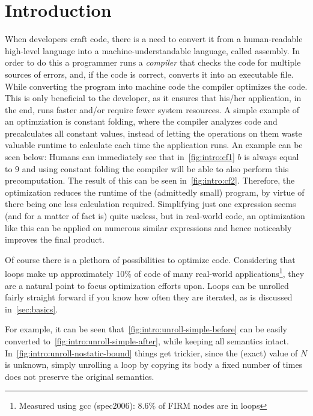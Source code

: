 \chapter{Introduction}\label{sec:intro}



When developers craft code, there is a need to convert it from a human-readable high-level language into a machine-understandable language, called assembly.
In order to do this a programmer runs a \textit{compiler} that checks the code for multiple sources of errors, and, if the code is correct, converts it into an executable file.
While converting the program into machine code the compiler optimizes the code.
This is only beneficial to the developer, as it ensures that his/her application, in the end, runs faster and/or require fewer system resources.
A simple example of an optimziation is constant folding, where the compiler analyzes code and precalculates all constant values, instead of letting the operations on them waste valuable runtime to calculate each time the application runs.
An example can be seen below:
Humans can immediately see that in~\cref{fig:intro:cf1} $b$ is always equal to $9$ and using constant folding the compiler will be able to also perform this precomputation.
The result of this can be seen in~\cref{fig:intro:cf2}.
Therefore, the optimization reduces the runtime of the (admittedly small) program, by virtue of there being one less calculation required.
Simplifying just one expression seems (and for a matter of fact is) quite useless, but in real-world code, an optimization like this can be applied on numerous similar expressions and hence noticeably improves the final product.



Of course there is a plethora of possibilities to optimize code.
Considering that loops make up approximately 10\% of code of many real-world applications\footnote{Measured using gcc (spec2006): 8.6\% of FIRM nodes are in loops}, they are a natural point to focus optimization efforts upon.
Loops can be unrolled fairly straight forward if you know how often they are iterated, as is discussed in~\cref{sec:basics}.

For example, it can be seen that~\cref{fig:intro:unroll-simple-before} can be easily converted to~\cref{fig:intro:unroll-simple-after}, while keeping all semantics intact.
In~\cref{fig:intro:unroll-nostatic-bound} things get trickier, since the (exact) value of $N$ is unknown, simply unrolling a loop by copying its body a fixed number of times does not preserve the original semantics.


